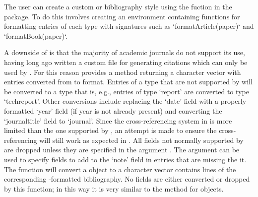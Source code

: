 \documentclass[article]{jss}\usepackage[]{graphicx}\usepackage[]{color}
\newcommand{\ourpkg}{\pkg{RefManageR}}
\begin{document}
The user can create a custom \Biblatex{} or \Bibtex{} bibliography style using the  fuction in the  package.  To do this involves creating an environment containing functions for formatting entries of each type with signatures such as `formatArticle(paper)` and `formatBook(paper)`.

A downside of \Biblatex{} is that the majority of academic journals do not support its use, having long ago written a custom  file for generating citations which can only be used by \Bibtex{}.  For this reason \ourpkg{} provides a  method returning a character vector with entries converted from \Biblatex{} to \Bibtex{} format.  Entries of a type that are not supported by \Bibtex{} will be converted to a type that is, e.g., entries of type `report' are converted to type `techreport'.  Other conversions include replacing the `date' field with a properly formatted `year' field (if year is not already present) and converting the `journaltitle' field to `journal'.  Since the cross-referencing system in \Bibtex{} is more limited than the one supported by \Biblatex{}, an attempt is made to ensure the cross-referencing will still work as expected in \Bibtex{}.  All fields not normally supported by \Bibtex{} are dropped unless they are specified in the argument .  The argument  can be used to specify fields to add to the `note' field in entries that are missing the it.  The  function will convert a  object to a character vector contains lines of the corresponding \Biblatex-formatted bibliography.  No fields are either converted or dropped by this function; in this way it is very similar to the  method for  objects.
\end{document}
